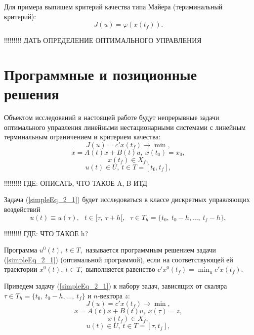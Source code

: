 Для примера выпишем критерий качества типа Майера (териминальный критерий):
\[ J(u) = \varphi (x(t_f)). \]

\bigskip
!!!!!!!!! ДАТЬ ОПРЕДЕЛЕНИЕ ОПТИМАЛЬНОГО УПРАВЛЕНИЯ

\bigskip



\section{Программные и позиционные решения}\label{1_2}
Объектом исследований в настоящей работе будут непрерывные задачи оптимального управления линейными нестационарными системами с линейным терминальным ограничением и критерием качества:
\begin{equation}\label{simpleEq_2_1}
    J(u) = c'x(t_f) \to \min,
\end{equation}
\[ \dot x = A(t)x + B(t)u, \ x(t_0) = x_0, \]
\[  x(t_f) \in X_f, \]
\[ u(t) \in U, \ t \in T = [t_0, t_f],\]

\bigskip
!!!!!!!!! ГДЕ: ОПИСАТЬ, ЧТО ТАКОЕ A, B ИТД

\bigskip


Задача (\ref{simpleEq_2_1}) будет исследоваться в классе дискретных управляющих воздействий 
\[u(t) \equiv u(\tau), ~~~t \in [\tau, ~\tau + h[,~~~ \tau \in T_h = \{t_0,~ t_0 - h, \dots ,~ t_f - h\}, \]

\bigskip
!!!!!!!!! ГДЕ: ЧТО ТАКОЕ h?

\bigskip



\begin{definition}   Программа $u^0(t), ~t \in T,$ называется программным решением задачи (\ref{simpleEq_2_1}) (оптимальной программой), если на соответствующей ей траектории $x^0(t), ~t \in T,$ выполняется равенство $c'x^0(t_f) = \min_u c'x(t_f) $.
\end{definition}


Приведем задачу (\ref{simpleEq_2_1}) к набору задач, зависящих от скаляра $\tau \in T_h = \{t_0,~ t_0 - h, \dots ,~ t_f\}$ и $n$-вектора $z$:
\begin{equation}\label{simpleEq_2_2}
    J(u) = c'x(t_f) \to \min,
\end{equation}
\[ \dot x = A(t)x + B(t)u, \ x(\tau) = z, \]
\[  x(t_f) \in X_f, \]
\[ u(t) \in U, \ t \in T = [\tau, t_f],\]


